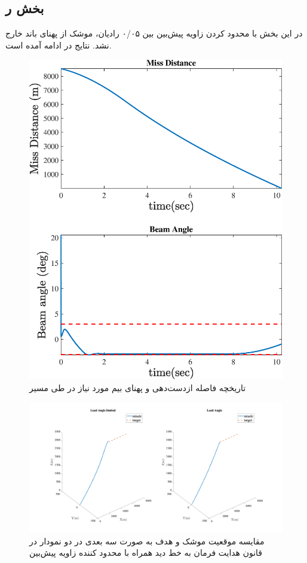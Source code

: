 \subsection{بخش ر}
در این بخش با محدود کردن زاویه پیش‌بین بین ۰/۰۵ رادیان، موشک از پهنای باند خارج نشد. نتایج در ادامه آمده است.

\begin{figure}[H]
	\centering
	\includegraphics[width=.75\linewidth]{../Figure/l/miss_distance_with_time}
	\caption{تاریخچه فاصله ازدست‌دهی و پهنای بیم مورد نیاز در طی مسیر}
\end{figure}

\begin{figure}[H]
	\centering
	\includegraphics[width=\linewidth]{../Figure/l/3DoF_missle_vs_target_state_lead_angle_limited}
	\caption{مقایسه موقعیت موشک و هدف به صورت سه بعدی در دو نمودار  در قانون هدایت فرمان به خط دید همراه با محدود کننده زاویه پیش‌بین
	}
\end{figure}


